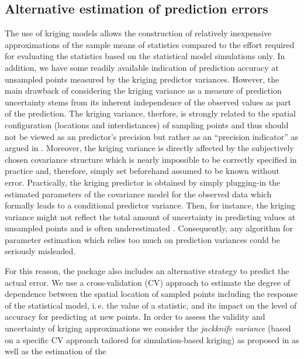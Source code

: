 \documentclass[article, nojss]{jss}
\numberwithin{equation}{section}			%
\begin{document}
\subsection{Alternative estimation of prediction errors}\label{subsec:altVar}
The use of kriging models allows the construction of relatively inexpensive
approximations of the sample means of statistics compared to the effort required
for evaluating the statistics based on the statistical model simulations only.
In addition, we have some readily available indication of prediction accuracy at unsampled points
measured by the kriging predictor variances. However, the main drawback of considering
the kriging variance as a measure of prediction uncertainty stems from its
inherent independence of the observed values as part of the prediction. The
kriging variance, therfore, is strongly related to the spatial configuration
(locations and interdistances) of sampling points and thus should not be viewed as an predictor's
precision but rather as an ``precision indicator'' as argued in
\citet[sect.~3.4.4]{ref:ChilesDelfiner1999}. Moreover, the kriging variance is directly
affected by the subjectively chosen covariance structure which is nearly impossible to be
correctly specified in practice and, therefore, simply set beforehand
assumed to be known without error. Practically, the kriging predictor is
obtained by simply plugging-in the estimated parameters of the covariance model
for the observed data which formally leads to a conditional predictor variance.
Then, for instance, the kriging variance might not reflect the total amount of uncertainty
in predicting values at unsampled points and is often underestimated
\citep[see][for a comprehensive discussion]{ref:Marchant2007}. Consequently, any algorithm
for parameter estimation which relies too much on prediction variances could be seriously
misleaded.\par
%
For this reason, the package also includes an alternative strategy to predict
the actual error. We use a cross-validation (CV) approach to estimate the degree
of dependence between the spatial location of sampled points including the response
of the statistical model, i.\,e. the value of a statistic, and its impact on the level
of accuracy for predicting at new points. In order to assess the validity and
uncertainty of kriging approximations we consider the \emph{jackknife variance}
(based on a specific CV approach tailored for simulation-based kriging) as
proposed in \citet{Kleijnen2004a} as well as the estimation of the
\end{document}
